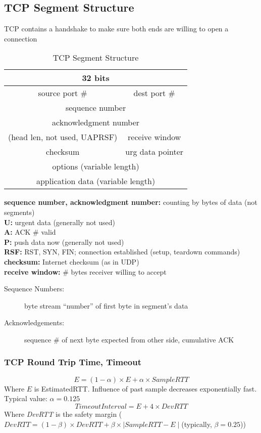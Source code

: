 \subsection{TCP Segment Structure}\label{sec:tcp}
\begin{leftbar}
	TCP contains a handshake to make sure both ends are willing to open a connection
\end{leftbar}
\begin{table}[H]
	\centering
	\caption{TCP Segment Structure}
	\begin{tabular}{cc}
		\toprule
		\multicolumn{2}{c}{32 bits}\\
		\midrule
		source port \# & dest port \#\\
		\multicolumn{2}{c}{sequence number}\\
		\multicolumn{2}{c}{acknowledgment number}\\
		(head len, not used, UAPRSF) & receive window\\
		checksum & urg data pointer\\
		\multicolumn{2}{c}{options (variable length)}\\
		\multicolumn{2}{c}{application data (variable length)}\\
		\bottomrule
	\end{tabular}
\end{table}
\begin{leftbar}
	\textbf{sequence number, acknowledgment number:} counting by bytes of data (not segments)\\
	\textbf{U:} urgent data (generally not used)\\
	\textbf{A:} ACK \# valid\\
	\textbf{P:} push data now (generally not used)\\
	\textbf{RSF:} RST, SYN, FIN; connection established (setup, teardown commands)\\
	\textbf{checksum:} Internet checksum (as in UDP)\\
	\textbf{receive window:} \# bytes receiver willing to accept
\end{leftbar}
\begin{description}
	\item[Sequence Numbers:] byte stream ``number'' of first byte in segment's data
	\item[Acknowledgements:] sequence \# of next byte expected from other side, cumulative ACK
\end{description}
\subsubsection{TCP Round Trip Time, Timeout}
$$ E = (1-\alpha)\times E+\alpha\times\textit{SampleRTT} $$
Where $E$ is EstimatedRTT. Influence of past sample decreases exponentially fast. Typical value: $\alpha = 0.125$
$$ \textit{TimeoutInterval} = E + 4\times\textit{DevRTT} $$
Where \textit{DevRTT} is the safety margin ($ \textit{DevRTT} = (1-\beta)\times\textit{DevRTT}+\beta\times\mid\textit{SampleRTT}-E\mid $(typically, $\beta=0.25$))
